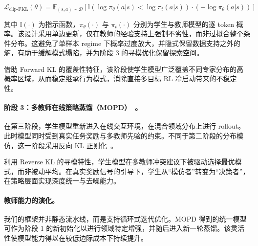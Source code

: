 \begin{equation}
\mathcal{L}_{\text{clip-FKL}}(\theta) = \mathbb{E}_{(s, a) \sim \mathcal{D}} \left[ \mathbb{I} \left( \log \pi_\theta(a|s) < \log \pi_t(a|s) \right) \cdot \left( - \log \pi_\theta(a|s) \right) \right]
\end{equation}

其中 $\mathbb{I}(\cdot)$ 为指示函数，$\pi_\theta(\cdot)$ 与 $\pi_t(\cdot)$ 分别为学生与教师模型的逐 token 概率。该设计采用单边更新，仅在教师的经验支持上强制不劣性，而非过拟合整个条件分布。这避免了单样本 regime 下概率过度放大，并隐式保留数据支持之外的熵，有助于缓解模式塌陷，并为阶段 3 的寻模优化保留探索空间。

借助 Forward KL 的覆盖性特征，该阶段使学生模型广泛覆盖不同专家分布的高概率区域，从而稳定继承行为模式，消除直接多目标 RL 冷启动带来的不稳定性。

\paragraph{阶段 3：多教师在线策略蒸馏（MOPD）~\cite{mimo2025flash}。}
在第三阶段，学生模型重新进入在线交互环境，在混合领域分布上进行 rollout。此时模型同时受到真实任务奖励与多教师先验的约束。不同于第二阶段的分布模仿，这一阶段采用反向 KL 正则化~\cite{lu2025onpolicydistillation}。

利用 Reverse KL 的寻模特性，学生模型在多教师冲突建议下被驱动选择最优模式，而非被动平均。在真实奖励信号的引导下，学生从“模仿者”转变为“决策者”，在策略层面实现深度统一与去噪能力。

\paragraph{教师能力的演化。}
我们的框架并非静态流水线，而是支持循环式迭代优化。MOPD 得到的统一模型可作为阶段 1 的新初始化以进行领域特定增强，并随后进入新一轮蒸馏。该灵活性使模型能力得以在较低边际成本下持续提升。
